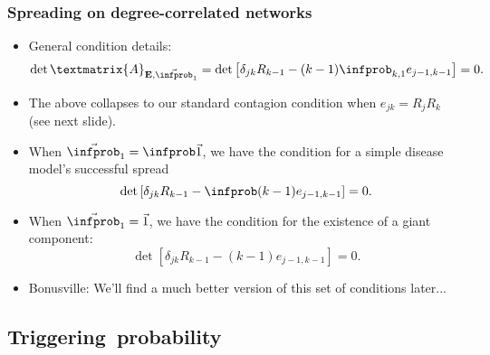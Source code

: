 \begin{frame}
  \frametitle{Spreading on degree-correlated networks}

  \begin{itemize}
  \item<1-> General condition details:
    $$
    \det{\textmatrix{A}_{\mathbf{E},\vec{\infprob}_1}}
    =
    \det
    \left[
      \delta_{jk} R_{k-1} 
      -
      (k-1) \infprob_{k,1} e_{j-1,k-1}
    \right] = 0.
    $$
  \item<2->
    The above collapses to our standard
    contagion condition when $e_{jk} = R_j R_k$ (see next slide).\cite{dodds2009a}
  \item<3->
    When $\vec{\infprob}_1=\infprob \vec{1}$, we have the condition
    for a simple disease model's successful spread
    $$
    \det
    \left[
      \delta_{jk} R_{k-1} 
      -
      \infprob (k-1)   e_{j-1,k-1}
    \right] = 0.
    $$
  \item<4-> 
    When $\vec{\infprob}_1=\vec{1}$, we have the condition
    for the existence of a giant component:
    $$
    \det
    \left[
      \delta_{jk} R_{k-1} 
      -
      (k-1) e_{j-1,k-1}
    \right] = 0.
    $$
  \item<5->
    Bonusville: We'll find a much better
    version of this set of conditions later...
  \end{itemize}

\end{frame}


\subsection{Triggering\ probability}

